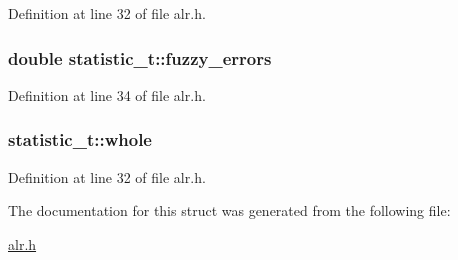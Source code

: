 Definition at line 32 of file alr.\-h.

\hypertarget{structstatistic__t_a725e02cd58507b86811bd8d43ae61085}{
\subsubsection[{fuzzy\-\_\-errors}]{\setlength{\rightskip}{0pt plus 5cm}double statistic\-\_\-t\-::fuzzy\-\_\-errors}}\label{structstatistic__t_a725e02cd58507b86811bd8d43ae61085}


Definition at line 34 of file alr.\-h.

\hypertarget{structstatistic__t_adbfaa1250ca1aa99329370593f10d513}{
\subsubsection[{whole}]{ statistic\-\_\-t\-::whole}}\label{structstatistic__t_adbfaa1250ca1aa99329370593f10d513}


Definition at line 32 of file alr.\-h.



The documentation for this struct was generated from the following file\-:\begin{DoxyCompactItemize}
\item 
\hyperlink{alr_8h}{alr.\-h}\end{DoxyCompactItemize}
